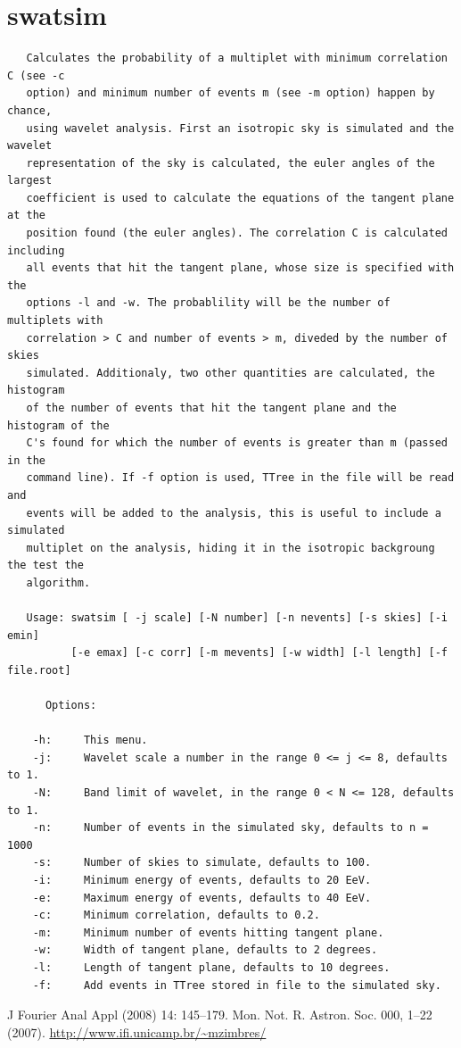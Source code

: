 \documentclass[12pt]{article}
\begin{document}
\section{swatsim}
{ \color{brown}
   \begin{lstlisting}
   Calculates the probability of a multiplet with minimum correlation C (see -c
   option) and minimum number of events m (see -m option) happen by chance,
   using wavelet analysis. First an isotropic sky is simulated and the wavelet
   representation of the sky is calculated, the euler angles of the largest
   coefficient is used to calculate the equations of the tangent plane at the
   position found (the euler angles). The correlation C is calculated including
   all events that hit the tangent plane, whose size is specified with the
   options -l and -w. The probablility will be the number of multiplets with
   correlation > C and number of events > m, diveded by the number of skies
   simulated. Additionaly, two other quantities are calculated, the histogram
   of the number of events that hit the tangent plane and the histogram of the
   C's found for which the number of events is greater than m (passed in the
   command line). If -f option is used, TTree in the file will be read and
   events will be added to the analysis, this is useful to include a simulated
   multiplet on the analysis, hiding it in the isotropic backgroung the test the
   algorithm.

   Usage: swatsim [ -j scale] [-N number] [-n nevents] [-s skies] [-i emin] 
          [-e emax] [-c corr] [-m mevents] [-w width] [-l length] [-f file.root]

      Options:

    -h:     This menu.
    -j:     Wavelet scale a number in the range 0 <= j <= 8, defaults to 1.
    -N:     Band limit of wavelet, in the range 0 < N <= 128, defaults to 1.
    -n:     Number of events in the simulated sky, defaults to n = 1000
    -s:     Number of skies to simulate, defaults to 100.
    -i:     Minimum energy of events, defaults to 20 EeV.
    -e:     Maximum energy of events, defaults to 40 EeV.
    -c:     Minimum correlation, defaults to 0.2.
    -m:     Minimum number of events hitting tangent plane.
    -w:     Width of tangent plane, defaults to 2 degrees.
    -l:     Length of tangent plane, defaults to 10 degrees.
    -f:     Add events in TTree stored in file to the simulated sky.
   \end{lstlisting}
}

\begin{thebibliography}{99}
 J Fourier Anal Appl (2008) 14: 145–179.
 Mon. Not. R. Astron. Soc. 000, 1–22 (2007). 
 \url{http://www.ifi.unicamp.br/~mzimbres/}
\end{thebibliography}
\end{document}

